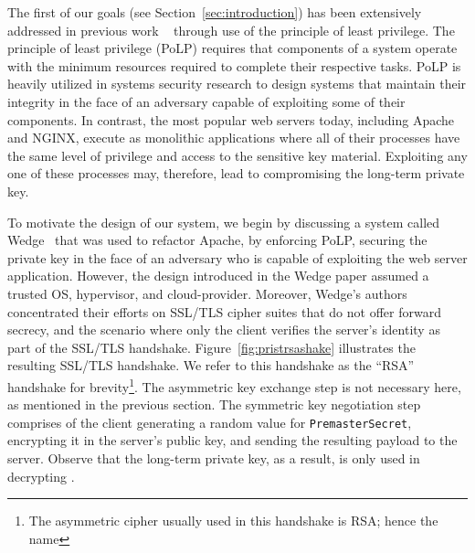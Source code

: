 \documentclass[../main.tex]{subfiles}
\begin{document}
The first of our goals (see Section~\ref{sec:introduction}) has been
extensively addressed in previous work ~\cite{Bittau08, Krohn2004}
through use of the principle of least privilege. The principle of
least privilege (PoLP) requires that components of a system operate
with the minimum resources required to complete their respective
tasks. PoLP is heavily utilized in systems security research to design
systems that maintain their integrity in the face of an adversary
capable of exploiting some of their components. In contrast, the most
popular web servers today, including Apache and NGINX, execute as
monolithic applications where all of their processes have the same
level of privilege and access to the sensitive key material.
Exploiting any one of these processes may, therefore, lead to
compromising the long-term private key.

To motivate the design of our system, we begin by discussing a system
called Wedge~\cite{Bittau08} that was used to refactor Apache, by
enforcing PoLP, securing the private key in the face of an adversary
who is capable of exploiting the web server application. However, the
design introduced in the Wedge paper assumed a trusted OS, hypervisor,
and cloud-provider. Moreover, Wedge's authors concentrated their
efforts on SSL/TLS cipher suites that do not offer forward secrecy,
and the scenario where only the client verifies the server's identity
as part of the SSL/TLS handshake. Figure~\ref{fig:pristrsashake}
illustrates the resulting SSL/TLS handshake. We refer to this
handshake as the ``RSA'' handshake for brevity\footnote{The asymmetric
  cipher usually used in this handshake is RSA; hence the name}. The
asymmetric key exchange step is not necessary here, as mentioned in
the previous section. The symmetric key negotiation step comprises of
the client generating a random value for \texttt{PremasterSecret},
encrypting it in the server's public key, and sending the resulting
payload to the server. Observe that the long-term private key, as a
result, is only used in decrypting \premaster.
\end{document}

